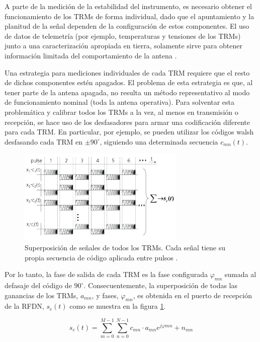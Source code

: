 A parte de la medición de la estabilidad del instrumento, es necesario obtener el funcionamiento de los TRMs de forma
individual, dado que el apuntamiento y la planitud de la señal dependen de la configuración de estos componentes. El uso de 
datos de telemetría (por ejemplo, temperaturas y tensiones de los TRMs) junto a una caracterización apropiada en tierra, 
solamente sirve para obtener información limitada del comportamiento de la antena \cite{Br2007}.

Una estrategia para mediciones individuales de cada TRM requiere que el resto de dichos componentes estén apagados. El problema
de esta estrategia es que, al tener parte de la antena apagada, no resulta un método representativo al modo de funcionamiento 
nominal (toda la antena operativa). Para solventar esta problemática y calibrar todos los TRMs a la vez, al menos en 
transmisión o recepción, se hace uso de los desfasadores para armar una codificación diferente para cada TRM. En particular, 
por ejemplo, se pueden utilizar los códigos walsh \cite{WalshCode} desfasando cada TRM en $\pm90^{\circ}$, siguiendo una 
determinada secuencia $c_{mn}(t)$.

\begin{figure}
 \centering
 \includegraphics[width=8cm]{gfx/superposition_signals_classic.png}
 \caption{Superposición de señales de todos los TRMs. Cada señal tiene su propia secuencia de código aplicada entre pulsos \cite{Br2007}.}
 \label{fig:sup_sign_classic}
\end{figure}

Por lo tanto, la fase de salida de cada TRM es la fase configurada $\varphi_{mn}$ sumada al defasaje del código de
$90^{\circ}$. Consecuentemente, la superposición de todas las ganancias de los TRMs, $a_{mn}$, y fases, $\varphi_{mn}$,
es obtenida en el puerto de recepción de la RFDN, $s_c(t)$ como se muestra en la figura \ref{fig:sup_sign_classic}.

\begin{equation}
	s_c(t) = \sum_{m=0}^{M-1}\sum_{n=0}^{N-1}c_{mn}\cdot a_{mn}e^{j\varphi{mn}} + n_{mn}
\end{equation}

